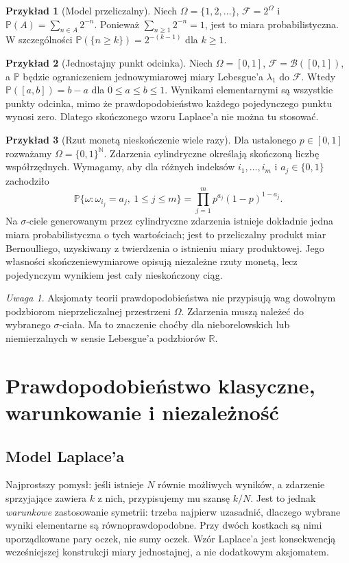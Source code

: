 \documentclass[11pt,a4paper,oneside]{report}
\numberwithin{equation}{chapter}
\theoremstyle{plain}
\theoremstyle{definition}
\newtheorem{przyklad}{Przykład}[chapter]
\theoremstyle{remark}
\newtheorem{uwaga}{Uwaga}[chapter]
\newcommand{\R}{\mathbb{R}}
\newcommand{\N}{\mathbb{N}}
\newcommand{\Prob}{\mathbb{P}}
\begin{document}
\begin{przyklad}[Model przeliczalny]
Niech $\Omega=\{1,2,\ldots\}$, $\mathcal F=2^\Omega$ i
$\Prob(A)=\sum_{n\in A}2^{-n}$. Ponieważ $\sum_{n\geq1}2^{-n}=1$,
jest to miara probabilistyczna. W szczególności
$\Prob(\{n\geq k\})=2^{-(k-1)}$ dla $k\geq1$.
\end{przyklad}

\begin{przyklad}[Jednostajny punkt odcinka]
Niech $\Omega=[0,1]$, $\mathcal F=\mathcal B([0,1])$,
a $\Prob$ będzie ograniczeniem jednowymiarowej miary Lebesgue'a
$\lambda_1$ do $\mathcal F$. Wtedy $\Prob([a,b])=b-a$
dla $0\leq a\leq b\leq1$. Wynikami elementarnymi są wszystkie
punkty odcinka, mimo że prawdopodobieństwo każdego pojedynczego
punktu wynosi zero. Dlatego skończonego wzoru Laplace'a nie można
tu stosować.
\end{przyklad}

\begin{przyklad}[Rzut monetą nieskończenie wiele razy]
Dla ustalonego $p\in[0,1]$ rozważamy $\Omega=\{0,1\}^{\N}$.
Zdarzenia cylindryczne określają skończoną liczbę współrzędnych.
Wymagamy, aby dla różnych indeksów $i_1,\ldots,i_m$ i
$a_j\in\{0,1\}$ zachodziło
\[
\Prob\{\omega:\omega_{i_j}=a_j,\ 1\leq j\leq m\}
=\prod_{j=1}^m p^{a_j}(1-p)^{1-a_j}.
\]
Na $\sigma$-ciele generowanym przez cylindryczne zdarzenia
istnieje dokładnie jedna miara probabilistyczna o tych wartościach;
jest to przeliczalny produkt miar Bernoulliego, uzyskiwany z twierdzenia
o istnieniu miary produktowej. Jego własności skończeniewymiarowe
opisują niezależne rzuty monetą, lecz pojedynczym wynikiem jest cały
nieskończony ciąg.
\end{przyklad}

\begin{uwaga}
Aksjomaty teorii prawdopodobieństwa nie przypisują wag dowolnym
podzbiorom nieprzeliczalnej przestrzeni $\Omega$. Zdarzenia muszą
należeć do wybranego $\sigma$-ciała. Ma to znaczenie choćby dla
nieborelowskich lub niemierzalnych w sensie Lebesgue'a podzbiorów $\R$.
\end{uwaga}

\chapter{Prawdopodobieństwo klasyczne, warunkowanie i niezależność}

\section{Model Laplace'a}
Najprostszy pomysł: jeśli istnieje $N$ równie możliwych wyników,
a zdarzenie sprzyjające zawiera $k$ z nich, przypisujemy mu
szansę $k/N$. Jest to jednak \emph{warunkowe} zastosowanie
symetrii: trzeba najpierw uzasadnić, dlaczego wybrane wyniki
elementarne są równoprawdopodobne. Przy dwóch kostkach są nimi
uporządkowane pary oczek, nie sumy oczek. Wzór Laplace'a jest
konsekwencją wcześniejszej konstrukcji miary jednostajnej,
a nie dodatkowym aksjomatem.
\end{document}
